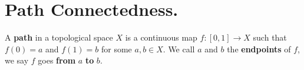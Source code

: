 
\section{Path Connectedness.}

\begin{definition}
    A \textbf{path} in a topological space $X$ is a continuous map  $f:[0,1]
    \xrightarrow{} X$ such that $f(0)=a$ and $f(1)=b$ for some $a,b \in X$. We
    call  $a$ and  $b$ the  \textbf{endpoints} of $f$, we say $f$ goes
    \textbf{from} $a$  \textbf{to} $b$.
\end{definition}
